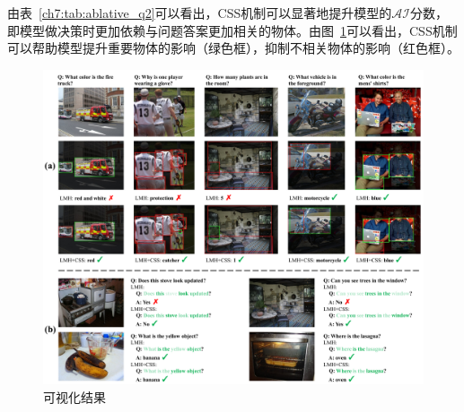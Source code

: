 \begin{table}[tbp]
    \begin{center}
    \end{center}
    \caption{VQA-CP-Rephrasing测试集的$CS(k)$和VQA-CP v2测试集的$\mathcal{CI}$分数}
    \label{ch7:tab:ablative_q3}
\end{table}

由表~\ref{ch7:tab:ablative_q2}可以看出，CSS机制可以显著地提升模型的$\mathcal{AI}$分数，即模型做决策时更加依赖与问题答案更加相关的物体。由图~\ref{ch7:fig:visualization}可以看出，CSS机制可以帮助模型提升重要物体的影响（绿色框），抑制不相关物体的影响（红色框）。

\begin{figure}[t]
    \centering
        \includegraphics[width=\linewidth]{chapter7/res/visualization.pdf}
    \caption{可视化结果}
    \label{ch7:fig:visualization}
\end{figure}



